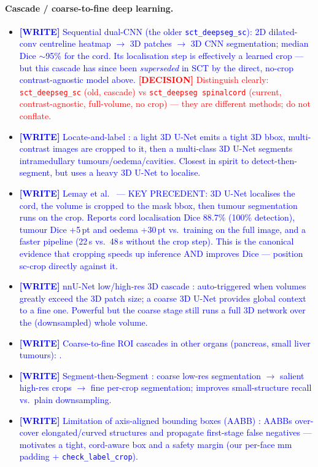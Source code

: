 \documentclass[11pt]{article}
\newcommand{\WRITE}[1]{\textcolor{blue}{\textbf{[WRITE]} #1}}
\newcommand{\DECISION}[1]{\textcolor{red}{\textbf{[DECISION]} #1}}
\begin{document}
\paragraph{Cascade / coarse-to-fine deep learning.}
\begin{itemize}
  \item \WRITE{Sequential dual-CNN \cite{gros2019deepseg} (the older
        \texttt{sct\_deepseg\_sc}): 2D dilated-conv centreline heatmap $\to$ 3D
        patches $\to$ 3D CNN segmentation; median Dice $\sim$95\% for the cord.
        Its localisation step is effectively a learned crop --- but this cascade
        has since been \emph{superseded} in SCT by the direct, no-crop
        contrast-agnostic model above. \DECISION{Distinguish clearly:
        \texttt{sct\_deepseg\_sc} (old, cascade) vs \texttt{sct\_deepseg
        spinalcord} (current, contrast-agnostic, full-volume, no crop) --- they
        are different methods; do not conflate.}}
  \item \WRITE{Locate-and-label \cite{gros2021tumor}: a light 3D U-Net emits a
        tight 3D bbox, multi-contrast images are cropped to it, then a
        multi-class 3D U-Net segments intramedullary tumours/oedema/cavities.
        Closest in spirit to detect-then-segment, but uses a heavy 3D U-Net to
        localise.}
  \item \WRITE{Lemay et al.\ \cite{lemay2021tumor} --- KEY PRECEDENT: 3D U-Net
        localises the cord, the volume is cropped to the mask bbox, then tumour
        segmentation runs on the crop. Reports cord localisation Dice 88.7\%
        (100\% detection), tumour Dice +5\,pt and oedema +30\,pt vs.\ training on
        the full image, and a faster pipeline (22\,s vs.\ 48\,s without the crop
        step). This is the canonical evidence that cropping speeds up inference
        AND improves Dice --- position sc-crop directly against it.}
  \item \WRITE{nnU-Net low/high-res 3D cascade \cite{isensee2021nnunet}:
        auto-triggered when volumes greatly exceed the 3D patch size; a coarse
        3D U-Net provides global context to a fine one. Powerful but the coarse
        stage still runs a full 3D network over the (downsampled) whole volume.}
  \item \WRITE{Coarse-to-fine ROI cascades in other organs (pancreas, small
        liver tumours): \cite{zhu2018c2f, zhou2018pancreas, wu2023liver}.}
  \item \WRITE{Segment-then-Segment \cite{bencevic2023sts}: coarse low-res
        segmentation $\to$ salient high-res crops $\to$ fine per-crop
        segmentation; improves small-structure recall vs.\ plain downsampling.}
  \item \WRITE{Limitation of axis-aligned bounding boxes (AABB)
        \cite{shin2024aabb}: AABBs over-cover elongated/curved structures and
        propagate first-stage false negatives --- motivates a tight, cord-aware
        box and a safety margin (our per-face mm padding + \texttt{check\_label\_crop}).}
\end{itemize}
\end{document}

